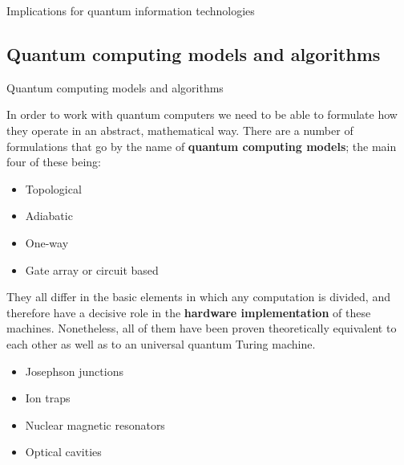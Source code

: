 \documentclass[9pt, handout, aspectratio=169]{beamer}	%
\begin{document}
\begin{frame}{Implications for quantum information technologies}
\begin{multicols}{2}
	\end{multicols}

\end{frame}


\subsection{Quantum computing models and algorithms}

\begin{frame}{Quantum computing models and algorithms}

	In order to work with quantum computers we need to be able to formulate how they operate in an abstract, mathematical way. There are a number of formulations that go by the name of \textbf{quantum computing models}; the main four of these being:

	\begin{multicols}{2}
		\begin{itemize}
			\item Topological
			\item Adiabatic
			\columnbreak
			\item One-way
			\item Gate array or circuit based
		\end{itemize}
	\end{multicols}

	\pause

	They all differ in the basic elements in which any computation is divided, and therefore have a decisive role in the \textbf{hardware implementation} of these machines. Nonetheless, all of them have been proven theoretically equivalent to each other as well as to an universal quantum Turing machine.

	\begin{multicols}{2}
		\begin{itemize}
			\item Josephson junctions
			\item Ion traps
			\columnbreak
			\item Nuclear magnetic resonators
			\item Optical cavities
		\end{itemize}
	\end{multicols}

\end{frame}

\end{document}
